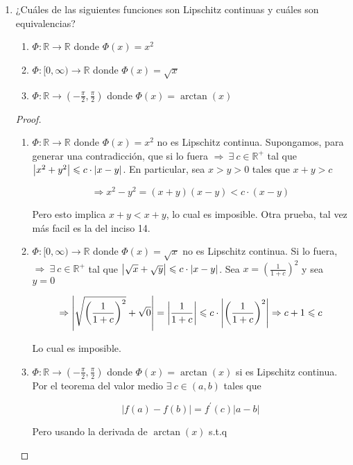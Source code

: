 \documentclass[12pt]{article}
\newcommand\R{\ensuremath{\mathbb{R}}}
\begin{document}
\begin{enumerate}[label=\textbf{\arabic*}.]
\begin{proof}
    $$\abs{f(x)-f(y)} = \abs{f^\prime (\lambda)} \abs{x-y} \leqslant c \cdot \abs{x-y}$$
\end{proof}

\item ¿Cuáles de las siguientes funciones son Lipschitz continuas y cuáles son equivalencias?
\begin{enumerate}
    \item $\Phi : \R \to \R$ donde $\Phi(x) = x^2$
    \item $\Phi : [0,\infty) \to \R$ donde $\Phi(x) = \sqrt{x}$
    \item $\Phi : \R \to (-\frac{\pi}{2},\frac{\pi}{2})$ donde $\Phi (x) = \arctan (x)$
\end{enumerate}

\begin{proof}
    \begin{enumerate}
        \item $\Phi : \R \to \R$ donde $\Phi(x) = x^2$ no es Lipschitz continua. Supongamos, para generar una contradicción, que si lo fuera $\Rightarrow \: \exists \: c \in \R^+$ tal que $\abs{x^2+y^2} \leqslant c \cdot \abs{x-y}$. En particular, sea $x > y > 0$ tales que $x+y > c$ 

        $$\Rightarrow x^2 - y^2 = (x+y)(x-y)  < c \cdot (x-y)$$

        Pero esto implica $x+y < x+y$, lo cual es imposible. Otra prueba, tal vez más facil es la del inciso 14.

        \item $\Phi : [0,\infty) \to \R$ donde $\Phi(x) = \sqrt{x}$ no es Lipschitz continua. Si lo fuera, $\Rightarrow \: \exists \: c \in \R^+$ tal que $\abs{\sqrt{x}+\sqrt{y}} \leqslant c \cdot \abs{x-y}$. Sea $x = \left( \frac{1}{1+c} \right)^2$ y sea $y=0$

        $$\Rightarrow \abs{\sqrt{ \left( \frac{1}{1+c} \right)^2}+\sqrt{0}} = \abs{\frac{1}{1+c}} \leqslant c \cdot \abs{ \left( \frac{1}{1+c} \right)^2} \Rightarrow c + 1 \leqslant c$$

        Lo cual es imposible.

        \item $\Phi : \R \to (-\frac{\pi}{2},\frac{\pi}{2})$ donde $\Phi (x) = \arctan (x)$ si es Lipschitz continua. Por el teorema del valor medio $\exists \: c \in (a,b)$ tales que

        $$|f(a)-f(b)|=f^{\prime}(c) |a-b|$$

        Pero usando la derivada de $\arctan (x)$ s.t.q


\end{enumerate}
\end{proof}
\end{enumerate}
\end{document}
